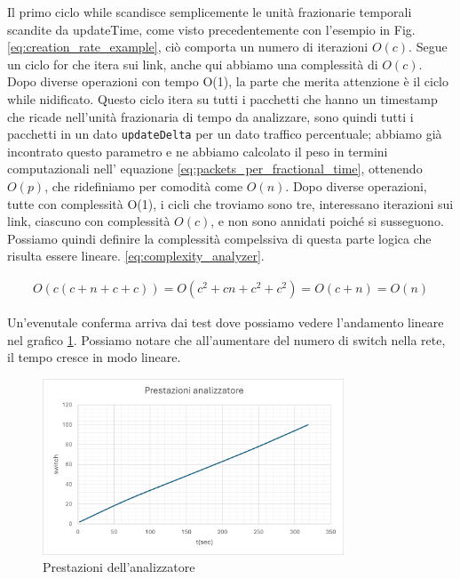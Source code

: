 \documentclass[binding=0.6cm]{sapthesis}
\begin{document}
Il primo ciclo while scandisce semplicemente le unità frazionarie temporali scandite da updateTime, come visto precedentemente con l'esempio in Fig. \ref{eq:creation_rate_example}, ciò comporta un numero di iterazioni \(O(c)\).
Segue un ciclo for che itera sui link, anche qui abbiamo una complessità di \(O(c)\). Dopo diverse operazioni con tempo O(1), la parte che merita attenzione è il ciclo while nidificato.
Questo ciclo itera su tutti i pacchetti che hanno un timestamp che ricade nell'unità frazionaria di tempo da analizzare, sono quindi tutti i pacchetti in un dato \texttt{updateDelta} per un dato traffico percentuale; abbiamo già incontrato questo
parametro e ne abbiamo calcolato il peso in termini computazionali nell' equazione \ref{eq:packets_per_fractional_time}, ottenendo \(O(p)\), 
che ridefiniamo per comodità come \(O(n)\). Dopo diverse
operazioni, tutte con complessità O(1), i cicli che troviamo sono tre, interessano iterazioni sui link, ciascuno con complessità \(O(c)\), e non sono annidati poiché si susseguono.
Possiamo quindi definire la complessità compelssiva di questa parte logica che risulta essere lineare. \ref{eq:complexity_analyzer}.


\begin{align}
    O(c(c+n+c+c)) = O(c^2 + cn + c^2 + c^2) = O(c + n) = O(n)
    \label{eq:complexity_analyzer}
\end{align}

Un'evenutale conferma arriva dai test dove possiamo vedere l'andamento lineare nel grafico \ref{fig:prestazioni_analizzatore}. Possiamo
notare che all'aumentare del numero di switch nella rete, il tempo cresce in modo lineare.

\begin{figure}[h]
    \centering
    \includegraphics[width=0.8\textwidth]{immagini/prestazioni_analyzer.png}
    \caption{Prestazioni dell'analizzatore}
    \label{fig:prestazioni_analizzatore}
\end{figure}
\end{document}
